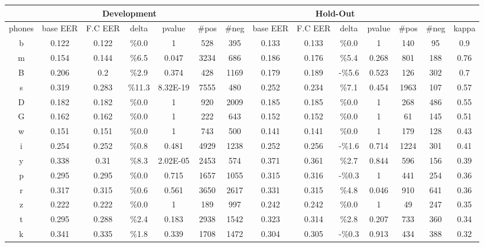 \begin{table}[H]
\tiny{
\centering
\renewcommand{\arraystretch}{2}

\begin{tabular}{|c| |c|c|c|c|c|c| |c|c|c|c|c|c| |c|}
\hline
& \multicolumn{5}{c}{Development} & & \multicolumn{5}{c}{Hold-Out} & &  \\ \hline
phones & base EER & F.C EER & delta & pvalue & \#pos & \#neg & base EER & F.C EER & delta & pvalue & \#pos & \#neg & kappa \\ \hline
b & 0.122 & 0.122 & \%0.0 & 1 & 528 & 395 & 0.133 & 0.133 & \%0.0 & 1 & 140 & 95 & 0.9 \\ \hline
\rowcolor{lightgray} m & 0.154 & 0.144 & \%6.5 & 0.047 & 3234 & 686 & 0.186 & 0.176 & \%5.4 & 0.268 & 801 & 188 & 0.76 \\ \hline
B & 0.206 & 0.2 & \%2.9 & 0.374 & 428 & 1169 & 0.179 & 0.189 & -\%5.6 & 0.523 & 126 & 302 & 0.7 \\ \hline
\rowcolor{lightgray} s & 0.319 & 0.283 & \%11.3 & 8.32E-19 & 7555 & 480 & 0.252 & 0.234 & \%7.1 & 0.454 & 1963 & 107 & 0.57 \\ \hline
D & 0.182 & 0.182 & \%0.0 & 1 & 920 & 2009 & 0.185 & 0.185 & \%0.0 & 1 & 268 & 486 & 0.55 \\ \hline
G & 0.162 & 0.162 & \%0.0 & 1 & 222 & 643 & 0.152 & 0.152 & \%0.0 & 1 & 61 & 145 & 0.51 \\ \hline
w & 0.151 & 0.151 & \%0.0 & 1 & 743 & 500 & 0.141 & 0.141 & \%0.0 & 1 & 179 & 128 & 0.43 \\ \hline
i & 0.254 & 0.252 & \%0.8 & 0.481 & 4929 & 1238 & 0.252 & 0.256 & -\%1.6 & 0.714 & 1224 & 301 & 0.41 \\ \hline
\rowcolor{lightgray} y & 0.338 & 0.31 & \%8.3 & 2.02E-05 & 2453 & 574 & 0.371 & 0.361 & \%2.7 & 0.844 & 596 & 156 & 0.39 \\ \hline
p & 0.295 & 0.295 & \%0.0 & 0.715 & 1657 & 1055 & 0.315 & 0.316 & -\%0.3 & 1 & 441 & 254 & 0.36 \\ \hline
r & 0.317 & 0.315 & \%0.6 & 0.561 & 3650 & 2617 & 0.331 & 0.315 & \%4.8 & 0.046 & 910 & 641 & 0.36 \\ \hline
z & 0.222 & 0.222 & \%0.0 & 1 & 189 & 997 & 0.242 & 0.242 & \%0.0 & 1 & 49 & 247 & 0.35 \\ \hline
t & 0.295 & 0.288 & \%2.4 & 0.183 & 2938 & 1542 & 0.323 & 0.314 & \%2.8 & 0.207 & 733 & 360 & 0.34 \\ \hline
k & 0.341 & 0.335 & \%1.8 & 0.339 & 1708 & 1472 & 0.304 & 0.305 & -\%0.3 & 0.913 & 434 & 388 & 0.32 \\ \hline

\end{tabular}}
\end{table}

